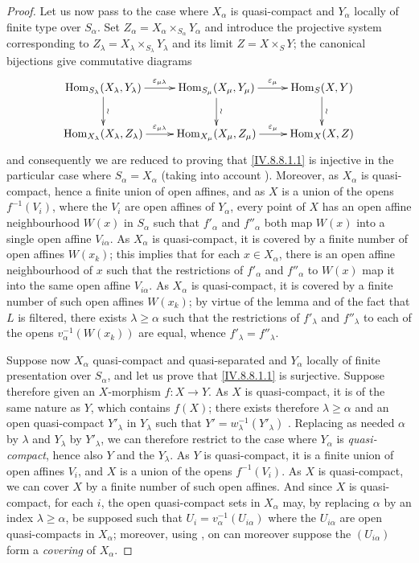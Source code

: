 \begin{proof}
Let us now pass to the case where $X_\alpha$ is quasi-compact and $Y_\alpha$ locally of finite type over $S_\alpha$.
Set $Z_\alpha=X_\alpha\times_{S_\alpha}Y_\alpha$ and introduce the projective system corresponding to $Z_\lambda=X_\lambda\times_{S_\lambda}Y_\lambda$ and its limit $Z=X\times_S Y$; the canonical bijections  give commutative diagrams
\[
\xymatrix{
  \operatorname{Hom}_{S_\lambda}(X_\lambda,Y_\lambda) \ar[r]^-{\varepsilon_{\mu\lambda}} \ar[d]^{\wr} & \operatorname{Hom}_{S_\mu}(X_\mu,Y_\mu) \ar[r]^-{\varepsilon_\mu} \ar[d]^{\wr} & \operatorname{Hom}_S(X,Y) \ar[d]^{\wr}\\
  \operatorname{Hom}_{X_\lambda}(X_\lambda,Z_\lambda) \ar[r]^-{\varepsilon_{\mu\lambda}} & \operatorname{Hom}_{X_\mu}(X_\mu,Z_\mu) \ar[r]^-{\varepsilon_\mu} & \operatorname{Hom}_X(X,Z)
}
\]
and consequently we are reduced to proving that \eqref{IV.8.8.1.1} is injective in the particular case where $S_\alpha=X_\alpha$ (taking into account ).
Moreover, as $X_\alpha$ is quasi-compact, hence a finite union of open affines, and as $X$ is a union of the opens $f^{-1}(V_i)$, where the $V_i$ are open affines of $Y_\alpha$, every point of $X$ has an open affine neighbourhood $W(x)$ in $S_\alpha$ such that $f'_\alpha$ and $f''_\alpha$ both map $W(x)$ into a single open affine $V_{i\alpha}$.
As $X_\alpha$ is quasi-compact, it is covered by a finite number of open affines $W(x_k)$; this implies that for each $x\in X_\alpha$, there is an open affine neighbourhood of $x$ such that the restrictions of $f'_\alpha$ and $f''_\alpha$ to $W(x)$ map it into the same open affine $V_{i\alpha}$.
As $X_\alpha$ is quasi-compact, it is covered by a finite number of such open affines $W(x_k)$; by virtue of the lemma  and of the fact that $L$ is filtered, there exists $\lambda\geqslant\alpha$ such that the restrictions of $f'_\lambda$ and $f''_\lambda$ to each of the opens $v_\alpha^{-1}(W(x_k))$ are equal, whence $f'_\lambda=f''_\lambda$.

Suppose now $X_\alpha$ quasi-compact and quasi-separated and $Y_\alpha$ locally of finite presentation over $S_\alpha$, and let us prove that \eqref{IV.8.8.1.1} is surjective.
Suppose therefore given an $X$-morphism $f:X\to Y$.
As $X$ is quasi-compact, it is of the same nature as $Y$, which contains $f(X)$; there exists therefore $\lambda\geqslant\alpha$ and an open quasi-compact $Y'_\lambda$ in $Y_\lambda$ such that $Y'=w_\lambda^{-1}(Y'_\lambda)$ .
Replacing as needed $\alpha$ by $\lambda$ and $Y_\lambda$ by $Y'_\lambda$, we can therefore restrict to the case where $Y_\alpha$ is \emph{quasi-compact}, hence also $Y$ and the $Y_\lambda$.
As $Y$ is quasi-compact, it is a finite union of open affines $V_i$, and $X$ is a union of the opens $f^{-1}(V_i)$.
As $X$ is quasi-compact, we can cover $X$ by a finite number of such open affines.
And since $X$ is quasi-compact, for each $i$, the open quasi-compact sets in $X_\alpha$ may, by replacing $\alpha$ by an index $\lambda\geqslant\alpha$, be supposed such that $U_i=v_\alpha^{-1}(U_{i\alpha})$ where the $U_{i\alpha}$ are open quasi-compacts in $X_\alpha$; moreover, using , on can moreover suppose the $(U_{i\alpha})$ form a \emph{covering} of $X_\alpha$.


\end{proof}
